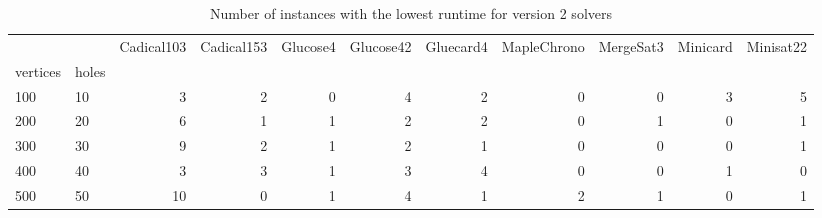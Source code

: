 \begin{table}[htbp]
\tiny
\centering
\begin{tabular}{llrrrrrrrrr}
\toprule
 & & Cadical103 & Cadical153 & Glucose4 & Glucose42 & Gluecard4 & MapleChrono & MergeSat3 & Minicard & Minisat22 \\
vertices & holes &  &  &  &  &  &  &  &  &  \\
\midrule
100 & 10 & 3 & 2 & 0 & 4 & 2 & 0 & 0 & 3 & 5 \\
\cline{1-11}
200 & 20 & 6 & 1 & 1 & 2 & 2 & 0 & 1 & 0 & 1 \\
\cline{1-11}
300 & 30 & 9 & 2 & 1 & 2 & 1 & 0 & 0 & 0 & 1 \\
\cline{1-11}
400 & 40 & 3 & 3 & 1 & 3 & 4 & 0 & 0 & 1 & 0 \\
\cline{1-11}
500 & 50 & 10 & 0 & 1 & 4 & 1 & 2 & 1 & 0 & 1 \\
\cline{1-11}
\bottomrule
\end{tabular}
\caption{Number of instances with the lowest runtime for version 2 solvers}
\label{tab:SAT_small_time_v2}
\end{table}


